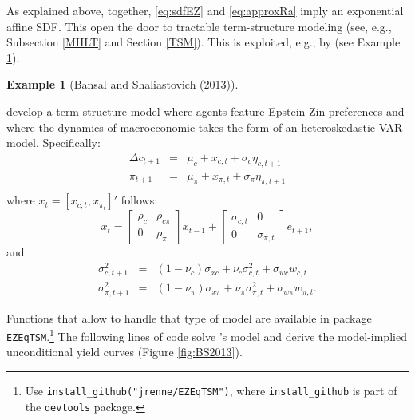 \documentclass[
  12pt,
]{book}
\theoremstyle{definition}
\theoremstyle{definition}
\newtheorem{example}{Example}[chapter]
\theoremstyle{definition}
\theoremstyle{definition}
\theoremstyle{remark}
\begin{document}
As explained above, together, \eqref{eq:sdfEZ} and \eqref{eq:approxRa} imply an exponential affine SDF. This open the door to tractable term-structure modeling (see, e.g., Subsection \ref{MHLT} and Section \ref{TSM}). This is exploited, e.g., by \citet{Bansal_Shaliastovich_2013} (see Example \ref{exm:BS2013}).

\begin{example}[Bansal and Shaliastovich (2013)]
\protect\hypertarget{exm:BS2013}{}\label{exm:BS2013}

\citet{Bansal_Shaliastovich_2013} develop a term structure model where agents feature Epstein-Zin preferences and where the dynamics of macroeconomic takes the form of an heteroskedastic VAR model. Specifically:
\begin{eqnarray*}
\Delta c_{t+1} &=& \mu_c + x_{c,t} + \sigma_c \eta_{c,t+1}\\
\pi_{t+1} &=& \mu_\pi + x_{\pi,t} + \sigma_\pi \eta_{\pi,t+1}\\
\end{eqnarray*}
where \(x_t = [x_{c,t},x_{\pi_t}]'\) follows:
\[
x_t = \left[\begin{array}{cc}\rho_c & \rho_{c \pi}\\0&\rho_\pi\end{array}\right] x_{t-1} + \left[\begin{array}{cc}\sigma_{c,t} & 0\\0&\sigma_{\pi,t}\end{array}\right] e_{t+1},
\]
and
\begin{eqnarray}
\sigma_{c,t+1}^2 &=& (1-\nu_c)\sigma_{xc} + \nu_c\sigma_{c,t}^2  + \sigma_{wc}w_{c,t}\\ \sigma_{\pi,t+1}^2 &=& (1-\nu_\pi)\sigma_{x\pi} + \nu_\pi\sigma_{\pi,t}^2  + \sigma_{w\pi}w_{\pi,t}.
\end{eqnarray}

Functions that allow to handle that type of model are available in package \texttt{EZEqTSM}.\footnote{Use \texttt{install\_github("jrenne/EZEqTSM")}, where \texttt{install\_github} is part of the \texttt{devtools} package.} The following lines of code solve \citet{Bansal_Shaliastovich_2013}'s model and derive the model-implied unconditional yield curves (Figure \ref{fig:BS2013}).


\end{example}
\end{document}
